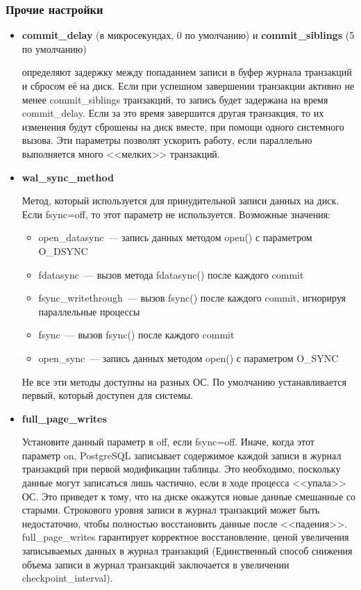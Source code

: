 \subsubsection{Прочие настройки}
\begin{itemize}
\item
\textbf{commit\_delay} (в микросекундах, 0 по умолчанию) и \textbf{commit\_sib\-lings} (5 по умолчанию)

определяют задержку между попаданием записи в буфер журнала транзакций и сбросом её на диск.
Если при успешном завершении транзакции активно не менее commit\_siblings транзакций, то запись будет задержана на время
commit\_delay. Если за это время завершится другая транзакция, то их изменения будут сброшены на диск вместе, при помощи
одного системного вызова. Эти параметры позволят ускорить работу, если параллельно выполняется много <<мелких>> транзакций.

\item \textbf{wal\_sync\_method}

Метод, который используется для принудительной записи данных на диск.
Если fsync=off, то этот параметр не используется.
Возможные значения:
\begin{itemize}
\item open\_datasync~--- запись данных методом open() с параметром O\_DSYNC
\item fdatasync~--- вызов метода fdatasync() после каждого commit
\item fsync\_writethrough~--- вызов fsync() после каждого commit, игнорируя параллельные процессы
\item fsync~--- вызов fsync() после каждого commit
\item open\_sync~--- запись данных методом open() с параметром O\_SYNC
\end{itemize}

Не все эти методы доступны на разных ОС. По умолчанию устанавливается первый, который доступен для системы.

\item \textbf{full\_page\_writes}

Установите данный параметр в off, если fsync=off. Иначе, когда этот параметр on, PostgreSQL записывает содержимое
каждой записи в журнал транзакций при первой модификации таблицы. Это необходимо, поскольку
данные могут записаться лишь частично, если в ходе процесса <<упала>> ОС. Это приведет к тому, что на диске окажутся
новые данные смешанные со старыми. Строкового уровня записи в журнал транзакций может быть недостаточно, чтобы полностью
восстановить данные после <<падения>>. full\_page\_writes гарантирует корректное восстановление, ценой увеличения записываемых
данных в журнал транзакций (Единственный способ снижения объема записи в журнал транзакций заключается в
увеличении checkpoint\_interval).


\end{itemize}
